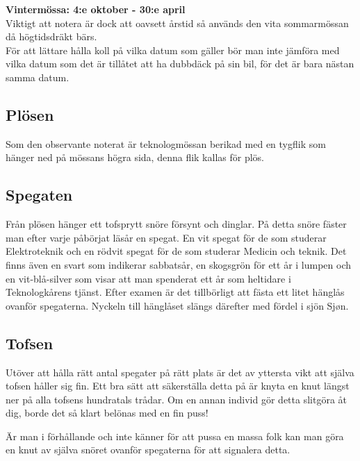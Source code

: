 \textbf{Vintermössa: 4:e oktober - 30:e april}
\\


Viktigt att notera är dock att oavsett årstid så används den vita sommarmössan då högtidsdräkt bärs.
\\


För att lättare hålla koll på vilka datum som gäller bör man inte jämföra med vilka datum som det är tillåtet att ha dubbdäck på sin bil, för det är bara nästan samma datum.


\newpage
\enlargethispage*{1cm}

\subsection*{Plösen}
Som den observante noterat är teknologmössan berikad med en tygflik som hänger ned på mössans högra sida, denna flik kallas för plös. 
\\

\subsection*{Spegaten}
Från plösen hänger ett tofsprytt snöre försynt och dinglar. 
På detta snöre fäster man efter varje påbörjat läsår en spegat. 
En vit spegat för de som studerar Elektroteknik och en rödvit spegat 
för de som studerar Medicin och teknik.
Det finns även en svart som indikerar sabbatsår, en skogsgrön för ett 
år i lumpen och en vit-blå-silver som visar att man spenderat ett år som 
heltidare i Teknologkårens tjänst.
Efter examen är det tillbörligt att fästa ett litet hänglås ovanför spegaterna. 
Nyckeln till hänglåset slängs därefter med fördel i sjön Sjøn.
\\


\subsection*{Tofsen}
Utöver att hålla rätt antal spegater på rätt plats är det av yttersta vikt att själva tofsen håller sig fin. Ett bra sätt att säkerställa detta på är knyta en knut längst ner på alla tofsens hundratals trådar. Om en annan individ gör detta slitgöra åt dig, borde det så klart belönas med en fin puss!


Är man i förhållande och inte känner för att pussa en massa folk kan man göra en knut av själva snöret ovanför spegaterna för att signalera detta.
\\


\newpage

